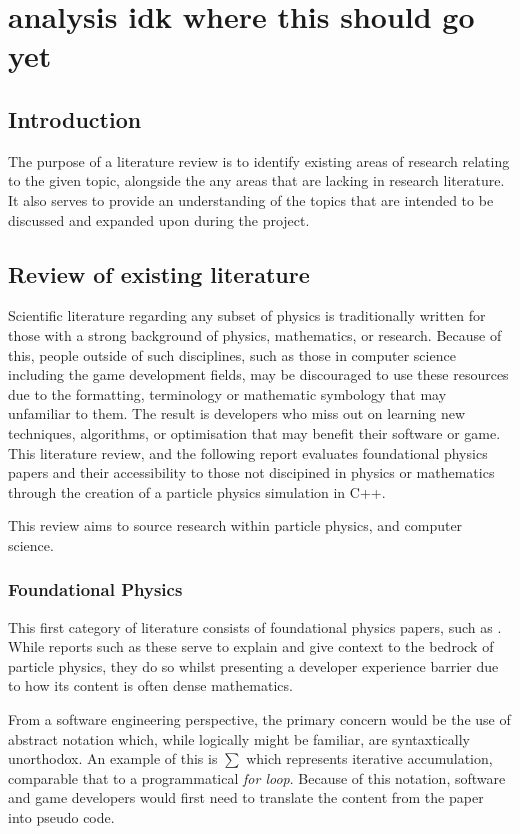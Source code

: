 \chapter{analysis idk where this should go yet}

\section{Introduction}

The purpose of a literature review is to identify existing areas of research relating to the given topic, alongside the any areas that are lacking in
research literature. It also serves to provide an understanding of the topics that are intended to be discussed and expanded upon during the project.

\section{Review of existing literature}

Scientific literature regarding any subset of physics is traditionally written for those with a strong background of 
physics, mathematics, or research. Because of this, people outside of such disciplines, such as those in computer
science including the game development fields, may be discouraged to use these resources due to the formatting,
terminology or mathematic symbology that may unfamiliar to them. The result is developers who miss out on 
learning new techniques, algorithms, or optimisation that may benefit their software or game. This literature 
review, and the following report evaluates foundational physics papers and their accessibility to those not 
discipined in physics or mathematics through the creation of a particle physics simulation in C++. 

This review aims to source research within particle physics, and computer science.

\subsection{Foundational Physics}

This first category of literature consists of foundational physics papers, such as . While reports such as these serve to
explain and give context to the bedrock of particle physics, they do so whilst presenting a developer experience barrier due to how its content is often dense mathematics.

From a software engineering perspective, the primary concern would be the use of abstract notation which, while logically might be familiar, are syntaxtically unorthodox.
An example of this is $\sum$ which represents iterative accumulation, comparable that to a programmatical \textit{for loop}. Because of this notation, software
and game developers would first need to translate the content from the paper into pseudo code.

